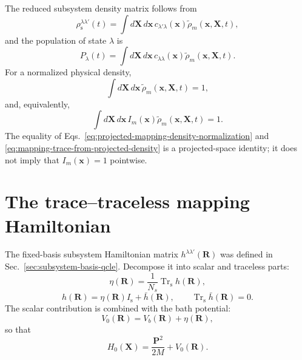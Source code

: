 \documentclass[
  11pt,
  letterpaper,
  onehalfspacing,
  normalmargins,
  equalmargins,
  oneside
]{ut-thesis}
\begin{document}
The reduced subsystem density matrix follows from
\begin{equation}
\rho_{\mathrm s}^{\lambda\lambda'}(t)
=
\int d\mathbf X\,d\mathbf x\,
 c_{\lambda'\lambda}(\mathbf x)
 \tilde\rho_m(\mathbf x,\mathbf X,t),
\label{eq:reduced-subsystem-density-from-mapping}
\end{equation}
and the population of state \(\lambda\) is
\begin{equation}
P_\lambda(t)
=
\int d\mathbf X\,d\mathbf x\,
 c_{\lambda\lambda}(\mathbf x)
 \tilde\rho_m(\mathbf x,\mathbf X,t).
\label{eq:mapping-population-from-c-symbol}
\end{equation}
For a normalized physical density,
\begin{equation}
\int d\mathbf X\,d\mathbf x\,
\tilde\rho_m(\mathbf x,\mathbf X,t)
=
1,
\label{eq:projected-mapping-density-normalization}
\end{equation}
and, equivalently,
\begin{equation}
\int d\mathbf X\,d\mathbf x\,
I_m(\mathbf x)
\tilde\rho_m(\mathbf x,\mathbf X,t)
=
1.
\label{eq:mapping-trace-from-projected-density}
\end{equation}
The equality of Eqs.~\eqref{eq:projected-mapping-density-normalization} and
\eqref{eq:mapping-trace-from-projected-density} is a projected-space identity;
it does not imply that \(I_m(\mathbf x)=1\) pointwise.


\section{The trace--traceless mapping Hamiltonian}
\label{sec:trace-traceless-mapping-hamiltonian}

The fixed-basis subsystem Hamiltonian matrix
\(h^{\lambda\lambda'}(\mathbf R)\) was defined in
Sec.~\ref{sec:subsystem-basis-qcle}. Decompose it into scalar and traceless
parts:
\begin{equation}
\eta(\mathbf R)
=
\frac{1}{N_s}
\operatorname{Tr}_{\mathrm s}h(\mathbf R),
\label{eq:trace-traceless-eta-definition}
\end{equation}
\begin{equation}
h(\mathbf R)
=
\eta(\mathbf R)I_{\mathrm s}
+
\bar h(\mathbf R),
\qquad
\operatorname{Tr}_{\mathrm s}\bar h(\mathbf R)=0.
\label{eq:trace-traceless-h-split}
\end{equation}
The scalar contribution is combined with the bath potential:
\begin{equation}
V_0(\mathbf R)
=
V_b(\mathbf R)+\eta(\mathbf R),
\label{eq:trace-traceless-v0-definition}
\end{equation}
so that
\begin{equation}
H_0(\mathbf X)
=
\frac{\mathbf P^2}{2M}+V_0(\mathbf R).
\label{eq:trace-traceless-h0-definition}
\end{equation}
\end{document}

